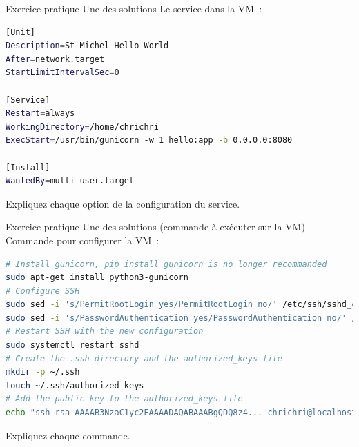 \documentclass{beamer}
\begin{document}
    \begin{frame}[fragile]{Exercice pratique \execcounterdispinc{}}{Une des solutions}
        Le service dans la VM~:
        \begin{lstlisting}[language=bash]
[Unit]
Description=St-Michel Hello World
After=network.target
StartLimitIntervalSec=0

[Service]
Restart=always
WorkingDirectory=/home/chrichri
ExecStart=/usr/bin/gunicorn -w 1 hello:app -b 0.0.0.0:8080

[Install]
WantedBy=multi-user.target
        \end{lstlisting}
        Expliquez chaque option de la configuration du service.
    \end{frame}

    \begin{frame}[fragile]{Exercice pratique \execcounterdispinc{}}{Une des solutions (commande à exécuter sur la VM)}
        Commande pour configurer la VM~:
        \begin{lstlisting}[language=bash]
# Install gunicorn, pip install gunicorn is no longer recommanded
sudo apt-get install python3-gunicorn
# Configure SSH
sudo sed -i 's/PermitRootLogin yes/PermitRootLogin no/' /etc/ssh/sshd_config
sudo sed -i 's/PasswordAuthentication yes/PasswordAuthentication no/' /etc/ssh/sshd_config
# Restart SSH with the new configuration
sudo systemctl restart sshd
# Create the .ssh directory and the authorized_keys file
mkdir -p ~/.ssh
touch ~/.ssh/authorized_keys
# Add the public key to the authorized_keys file
echo "ssh-rsa AAAAB3NzaC1yc2EAAAADAQABAAABgQDQ8z4... chrichri@localhost" >> ~/.ssh/authorized_keys
        \end{lstlisting}
        Expliquez chaque commande.
    \end{frame}
\end{document}
